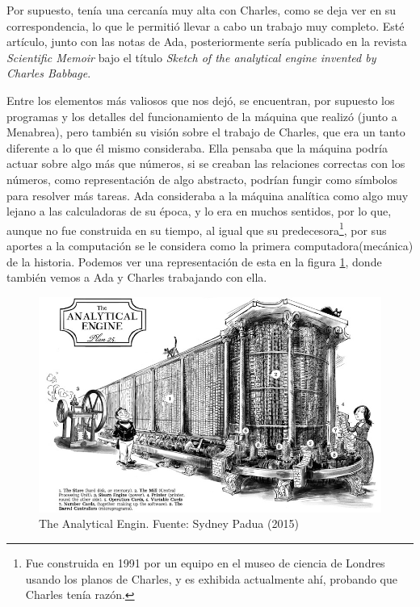 \documentclass[letterpaper,12pt,oneside]{book}
\begin{document}
        Por supuesto, tenía una cercanía muy alta con Charles, como se deja ver en su correspondencia, lo que le permitió llevar a cabo un 	
		trabajo muy completo. Esté artículo, junto con las notas de Ada, posteriormente sería publicado
		en la revista \textit{Scientific Memoir} bajo el título \textit{Sketch of the analytical engine invented by Charles Babbage}\cite{eric_kim_ada_1999}.
  
        Entre los elementos más valiosos que nos 
		dejó, se encuentran, por supuesto los programas y los detalles del funcionamiento de la máquina que realizó (junto a Menabrea), pero también su visión sobre el trabajo de 
		Charles, que era un tanto diferente a lo que él mismo consideraba. Ella pensaba que la máquina podría actuar sobre  algo más que números, si se creaban las relaciones correctas con los números,  como representación de algo 
		abstracto, podrían fungir como símbolos para resolver más tareas. Ada consideraba a la máquina analítica como algo muy lejano a las calculadoras de su época,
		y lo era en muchos sentidos, por lo que, aunque no fue construida en su tiempo, al igual que su predecesora\footnote{Fue construida en 1991 por un equipo en el museo de ciencia de Londres usando los planos de Charles, y es exhibida actualmente ahí, probando que Charles tenía razón.}, por sus aportes a la computación
		se le considera como la primera computadora(mecánica) de la historia\cite{eric_kim_ada_1999}. Podemos
  ver una representación de esta en la figura \ref{fig:analytical_engine}, donde también vemos a Ada y
  Charles trabajando con ella.
		
		\begin{figure}
		    \centering
		    \includegraphics[scale = 0.5]{media/Historia/analyticalEngine1_sydbeypadua.jpg}
		    \caption{The Analytical Engin. Fuente: Sydney Padua (2015)}
	    	\label{fig:analytical_engine}
		\end{figure}
				
\end{document}
